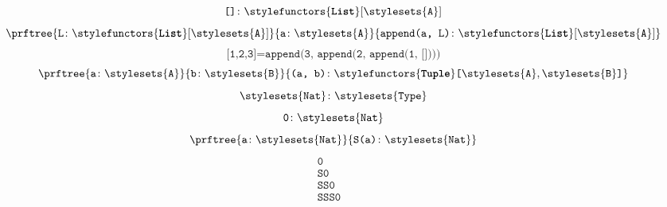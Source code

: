 \begin{forslides}
\begin{equation}
    \end{equation}
    \begin{equation}
        \label{eq:typecon_2_session1_22}
        \texttt{[]}\colon \stylefunctors{\textbf{\texttt{List}}}[\stylesets{\texttt{A}}]
    \end{equation}
    \begin{equation}
        \label{eq:typecon_3_session1_22}
        \prftree{\texttt{L}\colon \stylefunctors{\textbf{\texttt{List}}}[\stylesets{\texttt{A}}]}{\texttt{a}\colon \stylesets{\texttt{A}}}{\texttt{append(a, L)}\colon \stylefunctors{\textbf{\texttt{List}}}[\stylesets{\texttt{A}}]}
    \end{equation}
    \begin{equation}
        \label{eq:typecon_4_session1_22}
        \texttt{[1,2,3]} = \texttt{append(3, append(2, append(1, [])))}
    \end{equation}
    \begin{equation}
        \label{eq:typecon_5_session1_22}
        \prftree{\texttt{a}\colon \stylesets{\texttt{A}}}
        {\texttt{b}\colon \stylesets{\texttt{B}}}
        {\texttt{(a, b)}\colon \stylefunctors{\textbf{\texttt{Tuple}}}\texttt{[}\stylesets{\texttt{A}},\stylesets{\texttt{B}}\texttt{]}}
    \end{equation}
    \begin{equation}
        \label{eq:typecon_6_session1_22}
        \stylesets{\texttt{Nat}}\colon \stylesets{\texttt{Type}}
    \end{equation}
    \begin{equation}
        \label{eq:typecon_7_session1_22}
        \texttt{0}\colon \stylesets{\texttt{Nat}}
    \end{equation}
    \begin{equation}
        \label{eq:typecon_8_session1_22}
        \prftree{\texttt{a}\colon \stylesets{\texttt{Nat}}}
        {\texttt{S(a)}\colon \stylesets{\texttt{Nat}}}
    \end{equation}
    \begin{equation}
        \label{eq:typecon_9_session1_22}
        \begin{aligned}
            \texttt{0}    & \\
            \texttt{S0}   & \\
            \texttt{SS0}  & \\
            \texttt{SSS0} &
        \end{aligned}
    \end{equation}
    

\end{forslides}
